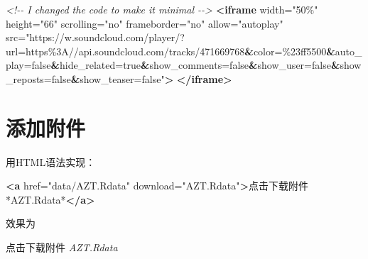 \documentclass[]{ctexbook}
\newenvironment{Shaded}{\begin{snugshade}}{\end{snugshade}}
\newcommand{\CommentTok}[1]{\textcolor[rgb]{0.56,0.35,0.01}{\textit{#1}}}
\newcommand{\ErrorTok}[1]{\textcolor[rgb]{0.64,0.00,0.00}{\textbf{#1}}}
\newcommand{\KeywordTok}[1]{\textcolor[rgb]{0.13,0.29,0.53}{\textbf{#1}}}
\newcommand{\NormalTok}[1]{#1}
\newcommand{\OtherTok}[1]{\textcolor[rgb]{0.56,0.35,0.01}{#1}}
\newcommand{\StringTok}[1]{\textcolor[rgb]{0.31,0.60,0.02}{#1}}
\begin{document}
\begin{Shaded}
\begin{Highlighting}[]
\CommentTok{\textless{}!{-}{-} I changed the code to make it minimal {-}{-}\textgreater{}}
\KeywordTok{\textless{}iframe}\OtherTok{ width=}\StringTok{"50\%"}\OtherTok{ height=}\StringTok{"66"} 
\OtherTok{        scrolling=}\StringTok{"no"}\OtherTok{ frameborder=}\StringTok{"no"} 
\OtherTok{        allow=}\StringTok{"autoplay"} 
\OtherTok{        src=}\StringTok{"https://w.soundcloud.com/player/?url=https\%3A//api.soundcloud.com/tracks/471669768}\ErrorTok{\&}\StringTok{color=\%23ff5500}\ErrorTok{\&}\StringTok{auto\_play=false}\ErrorTok{\&}\StringTok{hide\_related=true}\ErrorTok{\&}\StringTok{show\_comments=false}\ErrorTok{\&}\StringTok{show\_user=false}\ErrorTok{\&}\StringTok{show\_reposts=false}\ErrorTok{\&}\StringTok{show\_teaser=false"}\KeywordTok{\textgreater{}}
\KeywordTok{\textless{}/iframe\textgreater{}}
\end{Highlighting}
\end{Shaded}

\hypertarget{ux6dfbux52a0ux9644ux4ef6}{%
\section{添加附件}\label{ux6dfbux52a0ux9644ux4ef6}}

用HTML语法实现：

\begin{Shaded}
\begin{Highlighting}[]
\KeywordTok{\textless{}a}\OtherTok{ href=}\StringTok{"data/AZT.Rdata"}\OtherTok{ download=}\StringTok{"AZT.Rdata"}\KeywordTok{\textgreater{}}\NormalTok{点击下载附件 *AZT.Rdata*}\KeywordTok{\textless{}/a\textgreater{}}
\end{Highlighting}
\end{Shaded}

效果为

点击下载附件 \emph{AZT.Rdata}



\backmatter
\printindex
\end{document}
